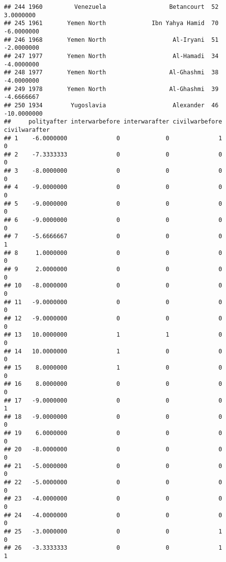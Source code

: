 \documentclass[
]{article}
\begin{document}
\begin{verbatim}
## 244 1960         Venezuela                  Betancourt  52    3.0000000
## 245 1961       Yemen North             Ibn Yahya Hamid  70   -6.0000000
## 246 1968       Yemen North                   Al-Iryani  51   -2.0000000
## 247 1977       Yemen North                   Al-Hamadi  34   -4.0000000
## 248 1977       Yemen North                  Al-Ghashmi  38   -4.0000000
## 249 1978       Yemen North                  Al-Ghashmi  39   -4.6666667
## 250 1934        Yugoslavia                   Alexander  46  -10.0000000
##     polityafter interwarbefore interwarafter civilwarbefore civilwarafter
## 1    -6.0000000              0             0              1             0
## 2    -7.3333333              0             0              0             0
## 3    -8.0000000              0             0              0             0
## 4    -9.0000000              0             0              0             0
## 5    -9.0000000              0             0              0             0
## 6    -9.0000000              0             0              0             0
## 7    -5.6666667              0             0              0             1
## 8     1.0000000              0             0              0             0
## 9     2.0000000              0             0              0             0
## 10   -8.0000000              0             0              0             0
## 11   -9.0000000              0             0              0             0
## 12   -9.0000000              0             0              0             0
## 13   10.0000000              1             1              0             0
## 14   10.0000000              1             0              0             0
## 15    8.0000000              1             0              0             0
## 16    8.0000000              0             0              0             0
## 17   -9.0000000              0             0              0             1
## 18   -9.0000000              0             0              0             0
## 19    6.0000000              0             0              0             0
## 20   -8.0000000              0             0              0             0
## 21   -5.0000000              0             0              0             0
## 22   -5.0000000              0             0              0             0
## 23   -4.0000000              0             0              0             0
## 24   -4.0000000              0             0              0             0
## 25   -3.0000000              0             0              1             0
## 26   -3.3333333              0             0              1             1

\end{verbatim}
\end{document}
